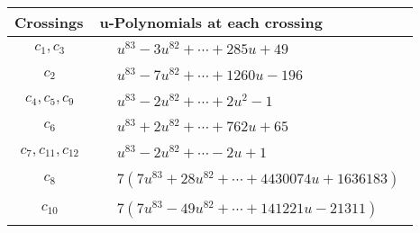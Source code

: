 \documentclass[1p]{elsarticle_modified}
\theoremstyle{definition}
\begin{document}
\begin{tabular}{m{50pt}|m{274pt}}
Crossings & \hspace{64pt}u-Polynomials at each crossing \\
\hline $$\begin{aligned}c_{1},c_{3}\end{aligned}$$&$\begin{aligned}
&u^{83}-3 u^{82}+\cdots+285 u+49
\end{aligned}$\\
\hline $$\begin{aligned}c_{2}\end{aligned}$$&$\begin{aligned}
&u^{83}-7 u^{82}+\cdots+1260 u-196
\end{aligned}$\\
\hline $$\begin{aligned}c_{4},c_{5},c_{9}\end{aligned}$$&$\begin{aligned}
&u^{83}-2 u^{82}+\cdots+2 u^2-1
\end{aligned}$\\
\hline $$\begin{aligned}c_{6}\end{aligned}$$&$\begin{aligned}
&u^{83}+2 u^{82}+\cdots+762 u+65
\end{aligned}$\\
\hline $$\begin{aligned}c_{7},c_{11},c_{12}\end{aligned}$$&$\begin{aligned}
&u^{83}-2 u^{82}+\cdots-2 u+1
\end{aligned}$\\
\hline $$\begin{aligned}c_{8}\end{aligned}$$&$\begin{aligned}
&7(7 u^{83}+28 u^{82}+\cdots+4430074 u+1636183)
\end{aligned}$\\
\hline $$\begin{aligned}c_{10}\end{aligned}$$&$\begin{aligned}
&7(7 u^{83}-49 u^{82}+\cdots+141221 u-21311)
\end{aligned}$\\
\hline
\end{tabular}\\~\\
\end{document}
